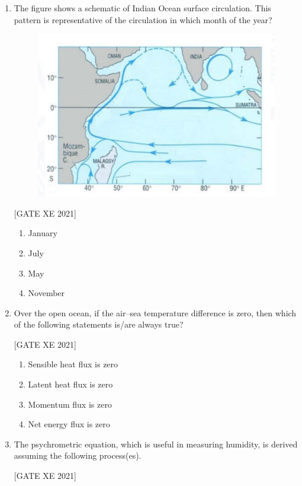 \documentclass[journal,12pt,onecolumn]{IEEEtran}
\theoremstyle{remark}
\begin{document}
\begin{enumerate}[resume]
\item The figure shows a schematic of Indian Ocean surface circulation. This pattern is representative of the circulation in which month of the year?

\begin{figure}[H]
      \centering
      \includegraphics[width=0.5\columnwidth]{figs/fig34.png}
      \caption{}
      \label{fig:placeholder}
  \end{figure}

\hfill[GATE XE 2021]

\begin{multicols}{2}
\begin{enumerate}
\item January
\item July
\item May
\item November
\end{enumerate}
\end{multicols}


\item Over the open ocean, if the air–sea temperature difference is zero, then which of the following statements is/are always true?

\hfill[GATE XE 2021]

\begin{multicols}{2}
\begin{enumerate}
\item Sensible heat flux is zero
\item Latent heat flux is zero
\item Momentum flux is zero
\item Net energy flux is zero
\end{enumerate}
\end{multicols}


\item The psychrometric equation, which is useful in measuring humidity, is derived assuming the following process(es).

\hfill[GATE XE 2021]


\end{enumerate}
\end{document}
